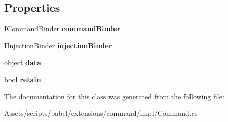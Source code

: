 \subsection*{Properties}
\begin{DoxyCompactItemize}
\item 
\hypertarget{classbabel_1_1extensions_1_1command_1_1impl_1_1_command_a45523839d897d6b240c8884e83aea629}{\hyperlink{interfacebabel_1_1extensions_1_1command_1_1api_1_1_i_command_binder}{I\-Command\-Binder} {\bfseries command\-Binder}}\label{classbabel_1_1extensions_1_1command_1_1impl_1_1_command_a45523839d897d6b240c8884e83aea629}

\item 
\hypertarget{classbabel_1_1extensions_1_1command_1_1impl_1_1_command_aa26d05de61b3d7eb425e71bab882c544}{\hyperlink{interfacebabel_1_1extensions_1_1injector_1_1api_1_1_i_injection_binder}{I\-Injection\-Binder} {\bfseries injection\-Binder}}\label{classbabel_1_1extensions_1_1command_1_1impl_1_1_command_aa26d05de61b3d7eb425e71bab882c544}

\item 
\hypertarget{classbabel_1_1extensions_1_1command_1_1impl_1_1_command_a0beb2f432887b83961bd6a504d27face}{object {\bfseries data}}\label{classbabel_1_1extensions_1_1command_1_1impl_1_1_command_a0beb2f432887b83961bd6a504d27face}

\item 
\hypertarget{classbabel_1_1extensions_1_1command_1_1impl_1_1_command_ae73973077ae842836f017a489f8bdcb1}{bool {\bfseries retain}}\label{classbabel_1_1extensions_1_1command_1_1impl_1_1_command_ae73973077ae842836f017a489f8bdcb1}

\end{DoxyCompactItemize}


The documentation for this class was generated from the following file\-:\begin{DoxyCompactItemize}
\item 
Assets/scripts/babel/extensions/command/impl/Command.\-cs\end{DoxyCompactItemize}

